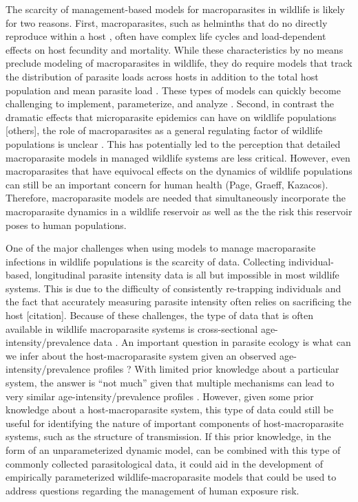 \documentclass[11pt]{article}
\begin{document}
The scarcity of management-based models for macroparasites in wildlife is likely for two reasons. First, macroparasites, such as helminths that do no directly reproduce within a host \citep{AndersonandMay1979}, often have complex life cycles and load-dependent effects on host fecundity and mortality. While these characteristics by no means preclude modeling of macroparasites in wildlife, they do require models that track the distribution of parasite loads across hosts in addition to the total host population and mean parasite load \citep{AndersonandMay1978,Cornell2010}.  These types of models can quickly become challenging to implement, parameterize, and analyze \citep{McCallum2017}.  Second, in contrast the dramatic effects that microparasite epidemics can have on wildlife populations \citep[e.g.][]{Webb2006,Hewson2014} [others], the role of macroparasites as a general regulating factor of wildlife populations is unclear \citep{Tompkins2002,Tompkins2011}. This has potentially led to the perception that detailed macroparasite models in managed wildlife systems are less critical. However, even macroparasites that have equivocal effects on the dynamics of wildlife populations can still be an important concern for human health (Page, Graeff, Kazacos). Therefore, macroparasite models are needed that simultaneously incorporate the macroparasite dynamics in a wildlife reservoir as well as the the risk this reservoir poses to human populations.  

One of the major challenges when using models to manage macroparasite infections in wildlife populations is the scarcity of data.  Collecting individual-based, longitudinal parasite intensity data is all but impossible in most wildlife systems. This is due to the difficulty of consistently re-trapping individuals and the fact that accurately measuring parasite intensity often relies on sacrificing the host [citation].  Because of these challenges, the type of data that is often available in wildlife macroparasite systems is cross-sectional age-intensity/prevalence data \citep[i.e. age-intensity/prevalence profiles][]{Pacala1988,Wilson2002}.  An important question in parasite ecology is what can we infer about the host-macroparasite system given an observed age-intensity/prevalence profiles \citep{Pacala1988,Wilson2002,Duerr2003}? With limited prior knowledge about a particular system, the answer is ``not much'' given that multiple mechanisms can lead to very similar age-intensity/prevalence profiles \citep{Wilson2002,Duerr2003}.  However, given some prior knowledge about a host-macroparasite system, this type of data could still be useful for identifying the nature of important components of host-macroparasite systems, such as the structure of transmission.  If this prior knowledge, in the form of an unparameterized dynamic model, can be combined with this type of commonly collected parasitological data, it could aid in the development of empirically parameterized wildlife-macroparasite models that could be used to address questions regarding the management of human exposure risk. 
\end{document}
